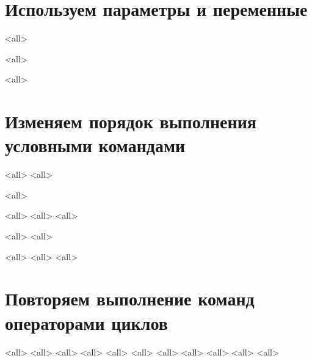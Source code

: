 \section{ Используем параметры и переменные }
\mode<all>{}

\mode<all>{}

\mode<all>{}

\section{ Изменяем порядок выполнения условными командами }

\mode<all>{}
\mode<all>{}

\mode<all>{}


\mode<all>{}
\mode<all>{}
\mode<all>{}

\mode<all>{}
\mode<all>{}

\mode<all>{}
\mode<all>{}
\mode<all>{}



\section{ Повторяем выполнение команд операторами циклов }
\mode<all>{}
\mode<all>{}
\mode<all>{}
\mode<all>{}
\mode<all>{}
\mode<all>{}
\mode<all>{}
\mode<all>{}
\mode<all>{}
\mode<all>{}
\mode<all>{}

